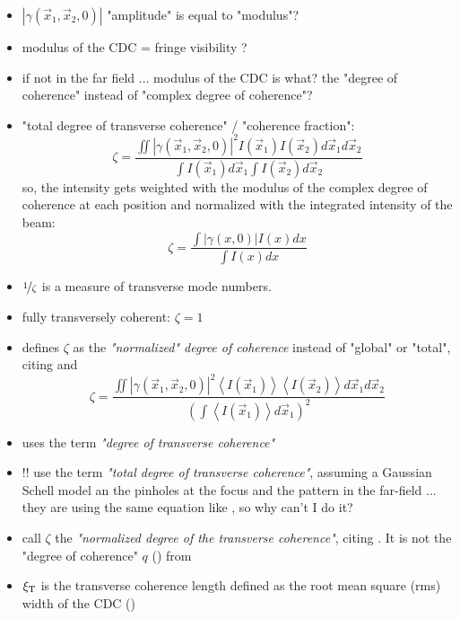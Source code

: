 \documentclass{article}
\newcommand{\mathup}[1]{\text{\textup{#1}}}
\begin{document}
\begin{itemize}
	\item  $ \left| \gamma(\vec{x}_1, \vec{x}_2, 0) \right| $ "amplitude" is equal to "modulus"?
	\item modulus of the CDC = fringe visibility ?
	\item if not in the far field ... modulus of the CDC is what? the "degree of coherence" instead of "complex degree of coherence"?
	\item "total degree of transverse coherence" / "coherence fraction":
	\begin{equation}\label{key}
	\zeta = \frac{\iint \left|  \gamma(\vec{x}_1, \vec{x}_2, 0) \right|^2 I(\vec{x}_1) I(\vec{x}_2) d\vec{x}_1 d\vec{x}_2}
	{\int I(\vec{x}_1) d\vec{x}_1 \int I(\vec{x}_2) d\vec{x}_2}
	\end{equation}
	so, the intensity gets weighted with the modulus of the complex degree of coherence at each position and normalized with the integrated intensity of the beam:
	\begin{equation}\label{key}
	\zeta = \frac{\int \left|  \gamma(x, 0) \right| I(x) dx }
	{\int I(x) dx}
	\end{equation}
	\item $ \nicefrac{1}{\zeta} $ is a measure of transverse mode numbers.
	\item fully transversely coherent: $ \zeta = 1 $ 
	\item \cite[eq. (6)]{SingerSorgenfreiMancusoEtAl2012} defines $ \zeta $ as the \textit{"normalized" degree of coherence} instead of "global" or "total", citing \cite[eq. 11]{SaldinSchneidmillerYurkov2008} and \cite{VartanyantsSingerMancusoEtAl2011}
	\begin{equation}\label{key}
	\zeta = \frac{\iint \left|  \gamma(\vec{x}_1, \vec{x}_2, 0) \right|^2 \left\langle I(\vec{x}_1)\right\rangle \left\langle  I(\vec{x}_2)\right\rangle  d\vec{x}_1 d\vec{x}_2}
	{\left( \int \left\langle I(\vec{x}_1) \right\rangle  d\vec{x}_1 \right)^2 }
	\end{equation}
	\item \cite[eq. 11]{SaldinSchneidmillerYurkov2008} uses the term \textit{"degree of transverse coherence"}
	\item !! \cite[pp. 3-4]{VartanyantsSingerMancusoEtAl2011} use the term \textit{"total degree of transverse coherence"}, assuming a Gaussian Schell model an the pinholes at the focus and the pattern in the far-field ... they are using the same equation like \cite[eq. 5]{BagschikFroemterMuellerEtAl2016a}, so why can't I do it?
	\item \cite[eq. 7]{VartanyantsSinger2010} call $ \zeta $ the \textit{"normalized degree of the transverse coherence"}, citing \cite[eq. 11]{SaldinSchneidmillerYurkov2008}. It is not the "degree of coherence" $ q $ (\cite[eq.34]{VartanyantsSinger2010}) from 
	\item $\xi_\mathup{T}$ is the transverse coherence length defined as the root mean square (rms) width of the CDC (\cite[eq.5]{BagschikFroemterMuellerEtAl2016a})
	
\end{itemize}
\end{document}
